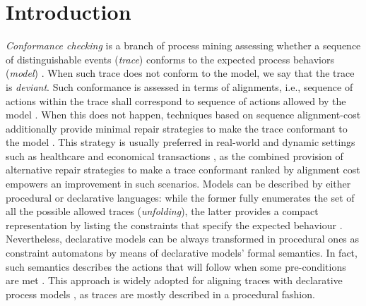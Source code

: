 \section{Introduction}
\textit{Conformance checking} is a branch of process mining  assessing whether a sequence of distinguishable events (\textit{trace}) conforms to the expected process behaviors (\textit{model}) \cite{Borrego014,LenoDM18}. When such trace does not conform to the model, we say that the trace is \textit{deviant}.  Such conformance is assessed in terms of alignments, i.e., sequence of actions within the trace shall correspond to sequence of actions allowed by the model \cite{LeoniAD12}. When this does not happen,  techniques based on sequence alignment-cost additionally provide minimal repair strategies   to  make the trace conformant to the model \cite{LeoniAD12,XuLZ17a}. This strategy is usually preferred in real-world and dynamic settings such as healthcare \cite{LeoniMA12} and economical transactions \cite{MultiPerspective}, as the combined provision of alternative repair strategies to make a trace conformant ranked by alignment cost empowers an improvement in such scenarios. Models can be described by either procedural or declarative languages: while the former fully enumerates the set of all the possible allowed traces (\textit{unfolding}), the latter provides a compact representation by listing the constraints that specify the expected behaviour \cite{LeoniMA12,XuLZ17a}. Nevertheless, declarative models can be always transformed in procedural ones as constraint automatons  by means of declarative models' formal semantics. In fact, such semantics describes the actions that will follow when some pre-conditions are met \cite{LiPZVR20}. This approach is widely adopted for aligning traces with declarative process models \cite{Westergaard11,LeoniMA12,XuLZ17a}, as traces are mostly described in a procedural fashion.  



